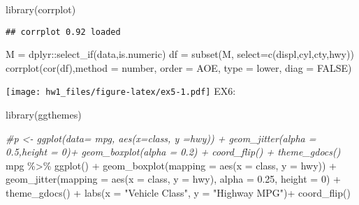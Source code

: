 \documentclass[
]{article}
\newenvironment{Shaded}{\begin{snugshade}}{\end{snugshade}}
\newcommand{\AttributeTok}[1]{\textcolor[rgb]{0.77,0.63,0.00}{#1}}
\newcommand{\CommentTok}[1]{\textcolor[rgb]{0.56,0.35,0.01}{\textit{#1}}}
\newcommand{\ConstantTok}[1]{\textcolor[rgb]{0.00,0.00,0.00}{#1}}
\newcommand{\DecValTok}[1]{\textcolor[rgb]{0.00,0.00,0.81}{#1}}
\newcommand{\FloatTok}[1]{\textcolor[rgb]{0.00,0.00,0.81}{#1}}
\newcommand{\FunctionTok}[1]{\textcolor[rgb]{0.00,0.00,0.00}{#1}}
\newcommand{\NormalTok}[1]{#1}
\newcommand{\OtherTok}[1]{\textcolor[rgb]{0.56,0.35,0.01}{#1}}
\newcommand{\SpecialCharTok}[1]{\textcolor[rgb]{0.00,0.00,0.00}{#1}}
\newcommand{\StringTok}[1]{\textcolor[rgb]{0.31,0.60,0.02}{#1}}
\begin{document}
\begin{Shaded}
\begin{Highlighting}[]
\FunctionTok{library}\NormalTok{(corrplot)}
\end{Highlighting}
\end{Shaded}

\begin{verbatim}
## corrplot 0.92 loaded
\end{verbatim}

\begin{Shaded}
\begin{Highlighting}[]
\NormalTok{M }\OtherTok{=}\NormalTok{ dplyr}\SpecialCharTok{::}\FunctionTok{select\_if}\NormalTok{(data,is.numeric) }
\NormalTok{df }\OtherTok{=} \FunctionTok{subset}\NormalTok{(M, }\AttributeTok{select=}\FunctionTok{c}\NormalTok{(}\StringTok{\textquotesingle{}displ\textquotesingle{}}\NormalTok{,}\StringTok{\textquotesingle{}cyl\textquotesingle{}}\NormalTok{,}\StringTok{\textquotesingle{}cty\textquotesingle{}}\NormalTok{,}\StringTok{\textquotesingle{}hwy\textquotesingle{}}\NormalTok{))}
\FunctionTok{corrplot}\NormalTok{(}\FunctionTok{cor}\NormalTok{(df),}\AttributeTok{method =} \StringTok{\textquotesingle{}number\textquotesingle{}}\NormalTok{, }\AttributeTok{order =} \StringTok{\textquotesingle{}AOE\textquotesingle{}}\NormalTok{, }\AttributeTok{type =} \StringTok{\textquotesingle{}lower\textquotesingle{}}\NormalTok{, }\AttributeTok{diag =} \ConstantTok{FALSE}\NormalTok{)}
\end{Highlighting}
\end{Shaded}

\texttt{[image: hw1\_files/figure-latex/ex5-1.pdf]} EX6:

\begin{Shaded}
\begin{Highlighting}[]
\FunctionTok{library}\NormalTok{(ggthemes)}

\CommentTok{\#p \textless{}{-} ggplot(data= mpg, aes(x=class, y =hwy)) + geom\_jitter(alpha = 0.5,height = 0)+ geom\_boxplot(alpha = 0.2) + coord\_flip() + theme\_gdocs()}
\NormalTok{mpg }\SpecialCharTok{\%\textgreater{}\%}
 \FunctionTok{ggplot}\NormalTok{() }\SpecialCharTok{+} \FunctionTok{geom\_boxplot}\NormalTok{(}\AttributeTok{mapping =} \FunctionTok{aes}\NormalTok{(}\AttributeTok{x =}\NormalTok{ class, }\AttributeTok{y =}\NormalTok{ hwy)) }\SpecialCharTok{+} \FunctionTok{geom\_jitter}\NormalTok{(}\AttributeTok{mapping =} \FunctionTok{aes}\NormalTok{(}\AttributeTok{x =}\NormalTok{ class, }\AttributeTok{y =}\NormalTok{ hwy), }\AttributeTok{alpha =} \FloatTok{0.25}\NormalTok{, }\AttributeTok{height =} \DecValTok{0}\NormalTok{) }\SpecialCharTok{+} \FunctionTok{theme\_gdocs}\NormalTok{() }\SpecialCharTok{+} 
  \FunctionTok{labs}\NormalTok{(}\AttributeTok{x =} \StringTok{"Vehicle Class"}\NormalTok{, }\AttributeTok{y =} \StringTok{"Highway MPG"}\NormalTok{)}\SpecialCharTok{+}
  \FunctionTok{coord\_flip}\NormalTok{()}
\end{Highlighting}
\end{Shaded}
\end{document}
